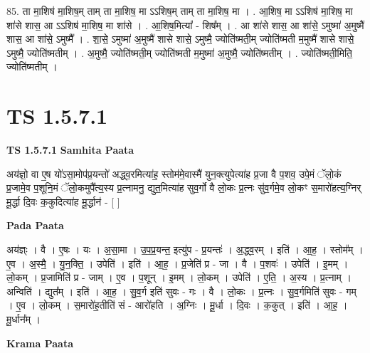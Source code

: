 \documentclass[17pt]{extarticle}
\begin{document}
85. ता मा॒शिष॑ मा॒शिष॒म् ताम् ता मा॒शिष॒ मा ऽऽशिष॒म् ताम् ता मा॒शिष॒ मा । . आ॒शिष॒ मा ऽऽशिष॑ मा॒शिष॒ मा शा॑से शास॒ आ ऽऽशिष॑ मा॒शिष॒ मा शा॑से । . आ॒शिष॒मित्या᳚ - शिष᳚म् । . आ शा॑से शास॒ आ शा॑से॒ ऽमुष्मा॑ अ॒मुष्मै॑ शास॒ आ शा॑से॒ ऽमुष्मै᳚ । . शा॒से॒ ऽमुष्मा॑ अ॒मुष्मै॑ शासे शासे॒ ऽमुष्मै॒ ज्योति॑ष्मती॒म् ज्योति॑ष्मती म॒मुष्मै॑ शासे शासे॒ ऽमुष्मै॒ ज्योति॑ष्मतीम् । . अ॒मुष्मै॒ ज्योति॑ष्मती॒म् ज्योति॑ष्मती म॒मुष्मा॑ अ॒मुष्मै॒ ज्योति॑ष्मतीम् । . ज्योति॑ष्मती॒मिति॒ ज्योति॑ष्मतीम् । \newline
\pagebreak
{}

\section{ TS 1.5.7.1 }

\textbf{TS 1.5.7.1 } \newline
\textbf{Samhita Paata} \newline

अय॑ज्ञो॒ वा ए॒ष यो॑ऽसा॒मोप॑प्र॒यन्तो॑ अद्ध्व॒रमित्या॑ह॒ स्तोम॑मे॒वास्मै॑ युन॒क्त्युपेत्या॑ह प्र॒जा वै प॒शव॒ उपे॒मं ॅलो॒कं प्र॒जामे॒व प॒शूनि॒मं ॅलो॒कमुपै᳚त्य॒स्य प्र॒त्नामनु॒ द्युत॒मित्या॑ह सुव॒र्गो वै लो॒कः प्र॒त्नः सु॑व॒र्गमे॒व लो॒कꣳ स॒मारो॑हत्य॒ग्निर् मू॒र्द्धा दि॒वः क॒कुदित्या॑ह मू॒र्द्धान॑ - [ ] \newline

\textbf{Pada Paata} \newline

अय॑ज्ञ्ः । वै । ए॒षः । यः । अ॒सा॒मा । उ॒प॒प्र॒यन्त॒ इत्यु॑प - प्र॒यन्तः॑ । अ॒द्ध्व॒रम् । इति॑ । आ॒ह॒ । स्तोम᳚म् । ए॒व । अ॒स्मै॒ । यु॒न॒क्ति॒ । उपेति॑ । इति॑ । आ॒ह॒ । प्र॒जेति॑ प्र - जा । वै । प॒शवः॑ । उपेति॑ । इ॒मम् । लो॒कम् । प्र॒जामिति॑ प्र - जाम् । ए॒व । प॒शून् । इ॒मम् । लो॒कम् । उपेति॑ । ए॒ति॒ । अ॒स्य । प्र॒त्नाम् । अन्विति॑ । द्युत᳚म् । इति॑ । आ॒ह॒ । सु॒व॒र्ग इति॑ सुवः - गः । वै । लो॒कः । प्र॒त्नः । सु॒व॒र्गमिति॑ सुवः - गम् । ए॒व । लो॒कम् । स॒मारो॑ह॒तीति॑ सं - आरो॑हति । अ॒ग्निः । मू॒र्धा । दि॒वः । क॒कुत् । इति॑ । आ॒ह॒ । मू॒र्धान᳚म् ।  \newline


\textbf{Krama Paata} \newline
\end{document}
